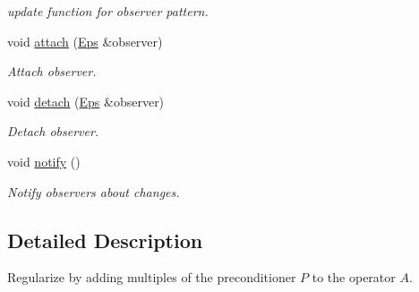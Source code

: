 \begin{DoxyCompactItemize}
\begin{DoxyCompactList}\small\item\em update function for observer pattern. \end{DoxyCompactList}\item 
\hypertarget{classSpacy_1_1Mixin_1_1MixinConnection_abb5520ee6b22dd993d78f142939a1ed4}{void \hyperlink{classSpacy_1_1Mixin_1_1MixinConnection_abb5520ee6b22dd993d78f142939a1ed4}{attach} (\hyperlink{classSpacy_1_1Mixin_1_1Eps_af616ae8e55a645cefd4d2d4504d6705a}{Eps} \&observer)}\label{classSpacy_1_1Mixin_1_1MixinConnection_abb5520ee6b22dd993d78f142939a1ed4}

\begin{DoxyCompactList}\small\item\em Attach observer. \end{DoxyCompactList}\item 
\hypertarget{classSpacy_1_1Mixin_1_1MixinConnection_adda739590c487679c26f60e50aedb73f}{void \hyperlink{classSpacy_1_1Mixin_1_1MixinConnection_adda739590c487679c26f60e50aedb73f}{detach} (\hyperlink{classSpacy_1_1Mixin_1_1Eps_af616ae8e55a645cefd4d2d4504d6705a}{Eps} \&observer)}\label{classSpacy_1_1Mixin_1_1MixinConnection_adda739590c487679c26f60e50aedb73f}

\begin{DoxyCompactList}\small\item\em Detach observer. \end{DoxyCompactList}\item 
\hypertarget{classSpacy_1_1Mixin_1_1MixinConnection_a1ddeaa78a3bb4a38c2cca36d1f99fe36}{void \hyperlink{classSpacy_1_1Mixin_1_1MixinConnection_a1ddeaa78a3bb4a38c2cca36d1f99fe36}{notify} ()}\label{classSpacy_1_1Mixin_1_1MixinConnection_a1ddeaa78a3bb4a38c2cca36d1f99fe36}

\begin{DoxyCompactList}\small\item\em Notify observers about changes. \end{DoxyCompactList}\end{DoxyCompactItemize}


\subsection{Detailed Description}
Regularize by adding multiples of the preconditioner $P$ to the operator $A$. 

